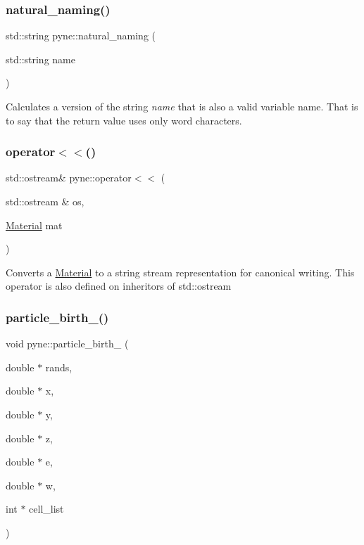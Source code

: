 \subsubsection{\texorpdfstring{natural\+\_\+naming()}{natural\_naming()}}
{\footnotesize\ttfamily std\+::string pyne\+::natural\+\_\+naming (\begin{DoxyParamCaption}\item[{std\+::string}]{name }\end{DoxyParamCaption})}

Calculates a version of the string {\itshape name} that is also a valid variable name. That is to say that the return value uses only word characters. \mbox{\label{namespacepyne_a1241699bbd3224bb066190b7778dbd82}} 
\subsubsection{\texorpdfstring{operator$<$$<$()}{operator<<()}}
{\footnotesize\ttfamily std\+::ostream\& pyne\+::operator$<$$<$ (\begin{DoxyParamCaption}\item[{std\+::ostream \&}]{os,  }\item[{\hyperlink{classpyne_1_1_material}{Material}}]{mat }\end{DoxyParamCaption})}

Converts a \hyperlink{classpyne_1_1_material}{Material} to a string stream representation for canonical writing. This operator is also defined on inheritors of std\+::ostream \mbox{\label{namespacepyne_a3018388cce855a6cee0d8e4c931aac4a}} 
\subsubsection{\texorpdfstring{particle\+\_\+birth\+\_\+()}{particle\_birth\_()}}
{\footnotesize\ttfamily void pyne\+::particle\+\_\+birth\+\_\+ (\begin{DoxyParamCaption}\item[{double $\ast$}]{rands,  }\item[{double $\ast$}]{x,  }\item[{double $\ast$}]{y,  }\item[{double $\ast$}]{z,  }\item[{double $\ast$}]{e,  }\item[{double $\ast$}]{w,  }\item[{int $\ast$}]{cell\+\_\+list }\end{DoxyParamCaption})}

